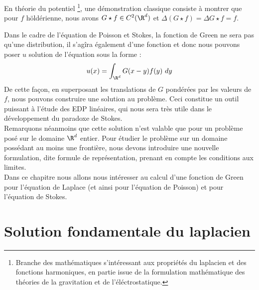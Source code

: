 \begin{remarkbox}
    \begin{remark}
        En théorie du potentiel \footnote{Branche des mathématiques s'intéressant aux propriétés du laplacien et des fonctions harmoniques, en partie issue de la formulation mathématique des théories de la gravitation et de l'éléctrostatique.}, une démonstration classique consiste à montrer que pour $f$ höldérienne, nous avons $G \star f \in C^2(\R^d)$ et $\Delta (G \star f) = \Delta G \star f = f $.
    \end{remark}
\end{remarkbox}
Dans le cadre de l'équation de Poisson et Stokes, la fonction de Green ne sera pas qu'une distribution, il s'agîra également d'une fonction et donc nous pouvons poser $u$ solution de l'équation sous la forme :
$$ u(x) = \int_{\R^d} G(x-y)f(y) \ dy $$
De cette façon, en superposant les translations de $G$ pondérées par les valeurs de $f$, nous pouvons construire une solution au problème. Ceci constitue un outil puissant à l'étude des EDP linéaires, qui nous sera très utile dans 
le développement du paradoxe de Stokes. \\
Remarquons néanmoins que cette solution n'est valable que pour un problème posé sur le domaine $\R^d$ entier. Pour étudier le problème sur un domaine possédant au moins une frontière, nous devons introduire une nouvelle 
formulation, dite formule de représentation, prenant en compte les conditions aux limites.\\
Dans ce chapitre nous allons nous intéresser au calcul d'une fonction de Green pour l'équation de Laplace (et ainsi pour l'équation de Poisson) et pour l'équation de Stokes.




\section{Solution fondamentale du laplacien}


